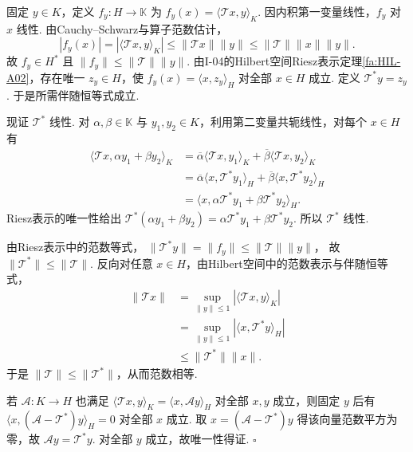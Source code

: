 \begin{FAProof}
固定 \(\displaystyle y\in K\)，定义 \(\displaystyle f_y:H\to\mathbb K\) 为 \(\displaystyle f_y(x)=\langle\mathcal T x,y\rangle_K\). 因内积第一变量线性，\(\displaystyle f_y\) 对 \(\displaystyle x\) 线性. 由Cauchy--Schwarz与算子范数估计，
\[
|f_y(x)|
=|\langle\mathcal T x,y\rangle_K|
\leqslant\|\mathcal T x\|\|y\|
\leqslant\|\mathcal T\|\|x\|\|y\|.
\]
故 \(\displaystyle f_y\in H^*\) 且 \(\displaystyle \|f_y\|\leqslant\|\mathcal T\|\|y\|\). 由I-04的Hilbert空间Riesz表示定理\autoref{fa:HIL-A02}，存在唯一 \(\displaystyle z_y\in H\)，使
\(\displaystyle f_y(x)=\langle x,z_y\rangle_H\)
对全部 \(\displaystyle x\in H\) 成立. 定义 \(\displaystyle \mathcal T^*y=z_y\). 于是所需伴随恒等式成立.

现证 \(\displaystyle \mathcal T^*\) 线性. 对 \(\displaystyle \alpha,\beta\in\mathbb K\) 与 \(\displaystyle y_1,y_2\in K\)，利用第二变量共轭线性，对每个 \(\displaystyle x\in H\) 有
\[
\begin{aligned}
\displaystyle \langle\mathcal T x,\alpha y_1+\beta y_2\rangle_K
&\displaystyle =\overline\alpha\langle\mathcal T x,y_1\rangle_K
+\overline\beta\langle\mathcal T x,y_2\rangle_K\\
&\displaystyle =\overline\alpha\langle x,\mathcal T^*y_1\rangle_H
+\overline\beta\langle x,\mathcal T^*y_2\rangle_H\\
&\displaystyle =\langle x,\alpha\mathcal T^*y_1+\beta\mathcal T^*y_2\rangle_H.
\end{aligned}
\]
Riesz表示的唯一性给出
\(\displaystyle \mathcal T^*(\alpha y_1+\beta y_2) =\alpha\mathcal T^*y_1+\beta\mathcal T^*y_2\).
所以 \(\displaystyle \mathcal T^*\) 线性.

由Riesz表示中的范数等式，
\(\displaystyle \|\mathcal T^*y\| =\|f_y\| \leqslant\|\mathcal T\|\|y\|\)，
故 \(\displaystyle \|\mathcal T^*\|\leqslant\|\mathcal T\|\). 反向对任意 \(\displaystyle x\in H\)，由Hilbert空间中的范数表示与伴随恒等式，
\[
\begin{aligned}
\displaystyle \|\mathcal T x\|
&\displaystyle =\sup_{\|y\|\leqslant1}|\langle\mathcal T x,y\rangle_K|\\
&\displaystyle =\sup_{\|y\|\leqslant1}|\langle x,\mathcal T^*y\rangle_H|\\
&\displaystyle \leqslant\|\mathcal T^*\|\|x\|.
\end{aligned}
\]
于是 \(\displaystyle \|\mathcal T\|\leqslant\|\mathcal T^*\|\)，从而范数相等.

若 \(\displaystyle \mathcal A:K\to H\) 也满足 \(\displaystyle \langle\mathcal T x,y\rangle_K=\langle x,\mathcal Ay\rangle_H\) 对全部 \(\displaystyle x,y\) 成立，则固定 \(\displaystyle y\) 后有 \(\displaystyle \langle x,(\mathcal A-\mathcal T^*)y\rangle_H=0\) 对全部 \(\displaystyle x\) 成立. 取 \(\displaystyle x=(\mathcal A-\mathcal T^*)y\) 得该向量范数平方为零，故 \(\displaystyle \mathcal Ay=\mathcal T^*y\). 对全部 \(\displaystyle y\) 成立，故唯一性得证.
\hfill\(\square\)
\end{FAProof}

